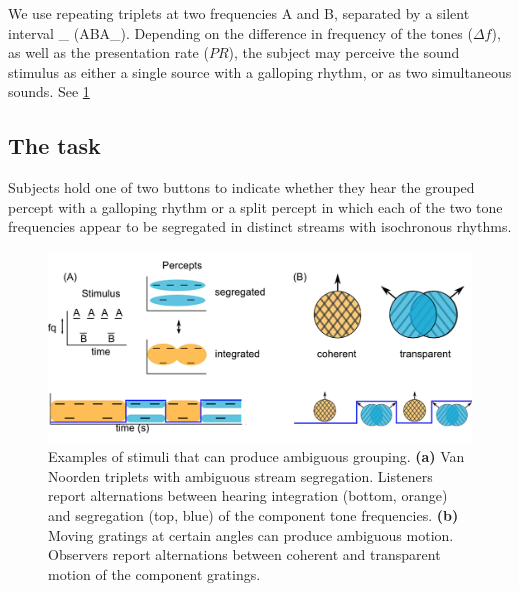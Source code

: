 We use repeating triplets at two frequencies A and B, separated by a silent interval \_ (ABA\_). Depending on the difference in frequency of the tones ($\Delta f$), as well as the presentation rate ($PR$), the subject may perceive the sound stimulus as either a single source with a galloping rhythm, or as two simultaneous sounds. See \ref{fig:percepts_timecourse} 

\subsection{The task}

Subjects hold one of two buttons to indicate whether they hear the grouped percept with a galloping rhythm or a split percept in which each of the two tone frequencies appear to be segregated in distinct streams with isochronous rhythms. 


\begin{figure}
	\centering
	\includegraphics[scale=0.7]{1-aba_stim_percepts.jpg}
	\caption{Examples of stimuli that can produce ambiguous grouping. \textbf{(a)} Van Noorden triplets with ambiguous stream segregation. Listeners report alternations between hearing integration (bottom, orange) and segregation (top, blue) of the component tone frequencies. \textbf{(b)} Moving gratings at certain angles can produce ambiguous motion. Observers report alternations between coherent and transparent motion of the component gratings.}
	\label{fig:percepts_timecourse}
\end{figure}



